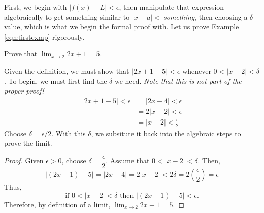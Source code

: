 First, we begin with $|f(x)-L|<\epsilon$, then manipulate that expression algebraically to get something similar to $|x-a|<\ $\textit{something}, then choosing a $\delta$ value, which is what we begin the formal proof with. Let us prove Example \ref{eqn:firstexmp} rigorously.
\begin{exmp}
	Prove that $\displaystyle\lim_{x\to 2} 2x+1 = 5$.
	\begin{soln}
		Given the definition, we must show that $|2x + 1 - 5| < \epsilon$ whenever $0 < |x-2| < \delta$. To begin, we must first find the $\delta$ we need. \textit{Note that this is not part of the proper proof!}
		\begin{align*}
			|2x + 1 - 5|<\epsilon &= |2x - 4|<\epsilon \\
			&=2|x - 2|<\epsilon \\
			&=|x - 2|<\frac{\epsilon}{2}
		\end{align*}
		Choose $\delta=\epsilon/2$. With this $\delta$, we subsitute it back into the algebraic steps to prove the limit.
	\end{soln}
	\begin{proof}
		Given $\epsilon > 0$, choose $\delta = \dfrac{\epsilon}{2}.$ Assume that $0< |x-2| <\delta$. Then,
		\[ |(2x + 1) - 5| = |2x - 4| = 2|x - 2| < 2\delta = 2\left(\frac{\epsilon}{2}\right) = \epsilon\]
		Thus,
		\[\text{if }0 < |x-2| < \delta \text{ then }|(2x + 1) - 5| < \epsilon.\] Therefore, by definition of a limit, $\displaystyle\lim_{x\to 2} 2x+1 = 5$.
	\end{proof}
\end{exmp}

